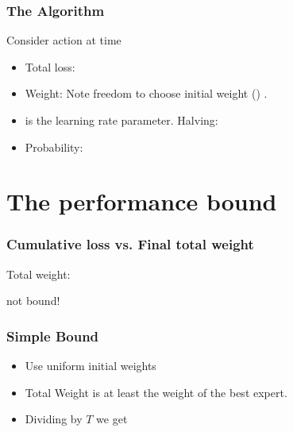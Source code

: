 \documentclass[handout]{beamer}
\begin{document}
\begin{frame}
\frametitle{The \ouralg Algorithm}
Consider action  at time 
\begin{itemize}
\item Total loss:
\item Weight:
Note freedom to choose initial weight ()
.
\item
{} is the learning rate parameter. Halving: \R{$\eta \to \infty$}
\item Probability:
\end{itemize}
\end{frame}

\section{The performance bound}

\begin{frame}
\frametitle{Cumulative loss vs. Final total weight}

 Total weight: 

 
 
\R{\[
\onslide<8-> -\log W^{T+1} =
\onslide<6-> -\log \frac{W^{T+1}}{W^1} = -\sum_{t=1}^T \log p_A^t(c^t)
\onslide<7-> = L_A^T
\]}
  not bound!
\end{frame}

\begin{frame}
\frametitle{Simple Bound}
\begin{itemize}
\item Use uniform initial weights 
\item Total Weight is at least the weight of the best expert.
\item Dividing by $T$ we get
\end{itemize}
\end{frame}
\end{document}
